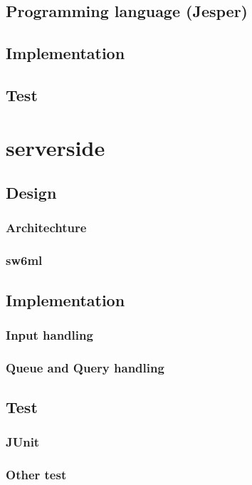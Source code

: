      \subsection{Programming language (Jesper)}
      
     \subsection{Implementation}
     \subsection{Test}

  \section{serverside} %
    
    \subsection{Design}

      \subsubsection{Architechture} %

      \subsubsection{sw6ml} %
    \subsection{Implementation}
      \subsubsection{Input handling} %
      \subsubsection{Queue and Query handling} %
    \subsection{Test}
      \subsubsection{JUnit}
      \subsubsection{Other test}


